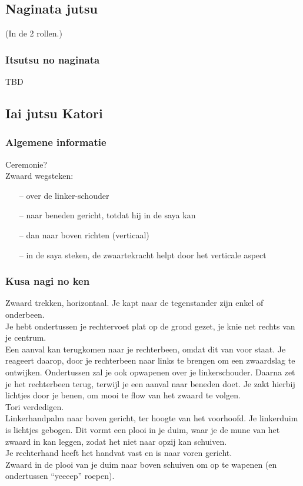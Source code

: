 \subsection{Naginata jutsu}
(In de 2 rollen.)

\subsubsection{Itsutsu no naginata}

TBD

\subsection{Iai jutsu Katori}

\subsubsection{Algemene informatie}

Ceremonie?\\

Zwaard wegsteken:
\begin{itemize}
\item[--] over de linker-schouder
\item[--] naar beneden gericht, totdat hij in de saya kan
\item[--] dan naar boven richten (verticaal)
\item[--] in de saya steken, de zwaartekracht helpt door het verticale aspect
\end{itemize}


\subsubsection{Kusa nagi no ken}

\suwaristart
Zwaard trekken, horizontaal. Je kapt naar de tegenstander zijn enkel of onderbeen.\\
Je hebt ondertussen je rechtervoet plat op de grond gezet, je knie net rechts van je centrum.\\
Een aanval kan terugkomen naar je rechterbeen, omdat dit van voor staat. Je reageert daarop, door je rechterbeen naar links te brengen om een zwaardslag te ontwijken. Ondertussen zal je ook opwapenen over je linkerschouder. Daarna zet je het rechterbeen terug, terwijl je een aanval naar beneden doet. Je zakt hierbij lichtjes door je benen, om mooi te flow van het zwaard te volgen.\\
Tori verdedigen.\\
Linkerhandpalm naar boven gericht, ter hoogte van het voorhoofd. Je linkerduim is lichtjes gebogen. Dit vormt een plooi in je duim, waar je de mune van het zwaard in kan leggen, zodat het niet naar opzij kan schuiven.\\
Je rechterhand heeft het handvat vast en is naar voren gericht.\\
Zwaard in de plooi van je duim naar boven schuiven om op te wapenen (en ondertussen ``yeeeep'' roepen).\\
\suwaristop

